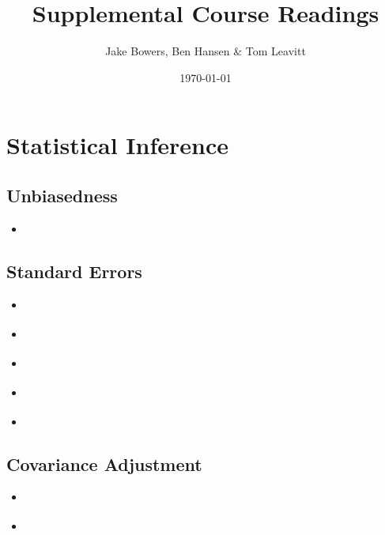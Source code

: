 \documentclass[12pt,leqno]{article}
\title{Supplemental Course Readings}
\author{Jake Bowers, Ben Hansen \& Tom Leavitt}
\date{\today}
\theoremstyle{newstyle}
\begin{document}
\maketitle

\newpage

\section{Statistical Inference}

\subsection{Unbiasedness}

\begin{itemize}

\item \citet[Section 2.4]{gerbergreen2012}

\end{itemize}

\subsection{Standard Errors}

\begin{itemize}

\item \citet[Chapter 3]{gerbergreen2012}

\item \citet[Chapter 6]{dunning2012}

\item \citet[Chapter 33, footnote 11]{fpp2007}

\item \citet{lin2013}

\item \citet{aronowetal2014}

\end{itemize}

\subsection{Covariance Adjustment}

\begin{itemize}

\item \citet[Chapter 4]{gerbergreen2012}

\item \citet{rosenbaum2002}

\end{itemize}
\end{document}
